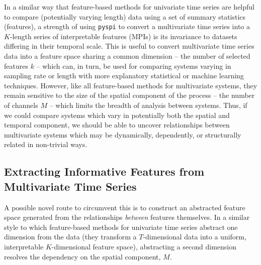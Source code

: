 \documentclass{article}
\theoremstyle{plain}
\theoremstyle{definition}
\theoremstyle{remark}
\begin{document}
In a similar way that feature-based methods for univariate time series are helpful to compare (potentially varying length) data using a set of summary statistics (features), a strength of using \texttt{pyspi} to convert a multivariate time series into a $K$-length series of interpretable features (MPIs) is its invariance to datasets differing in their temporal scale. This is useful to convert multivariate time series data into a feature space sharing a common dimension -- the number of selected features $k$ -- which can, in turn, be used for comparing systems varying in sampling rate or length with more explanatory statistical or machine learning techniques. However, like all feature-based methods for multivariate systems, they remain sensitive to the size of the spatial component of the process -- the number of channels $M$ -- which limits the breadth of analysis between systems. Thus, if we could compare systems which vary in potentially both the spatial and temporal component, we should be able to uncover relationships between multivariate systems which may be dynamically, dependently, or structurally related in non-trivial ways.

\subsection{Extracting Informative Features from Multivariate Time Series}
A possible novel route to circumvent this is to construct an abstracted feature space generated from the relationships \textit{between} features themselves. In a similar style to which feature-based methods for univariate time series abstract one dimension from the data (they transform a $T$-dimensional data into a uniform, interpretable $K$-dimensional feature space), abstracting a second dimension resolves the dependency on the spatial component, $M$. 
\end{document}
